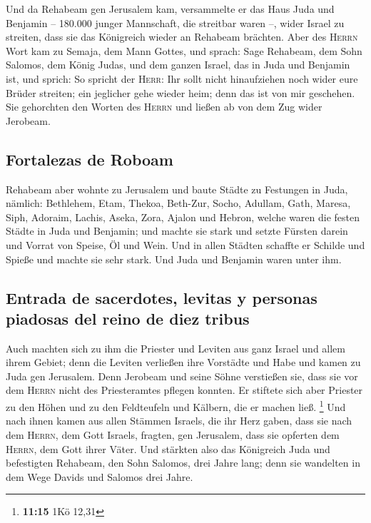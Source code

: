  Und da Rehabeam gen Jerusalem kam, versammelte er das
Haus Juda und Benjamin -- 180.000 junger Mannschaft, die streitbar waren
--, wider Israel zu streiten, dass sie das Königreich wieder an Rehabeam
brächten.  Aber des \textsc{Herrn} Wort kam zu Semaja, dem
Mann Gottes, und sprach:  Sage Rehabeam, dem Sohn Salomos,
dem König Judas, und dem ganzen Israel, das in Juda und Benjamin ist,
und sprich:  So spricht der \textsc{Herr}: Ihr sollt nicht
hinaufziehen noch wider eure Brüder streiten; ein jeglicher gehe wieder
heim; denn das ist von mir geschehen. Sie gehorchten den Worten des
\textsc{Herrn} und ließen ab von dem Zug wider Jerobeam.

\hypertarget{fortalezas-de-roboam}{%
\subsection{Fortalezas de Roboam}\label{fortalezas-de-roboam}}

 Rehabeam aber wohnte zu Jerusalem und baute Städte zu
Festungen in Juda,  nämlich: Bethlehem, Etam, Thekoa,
 Beth-Zur, Socho, Adullam,  Gath, Maresa,
Siph,  Adoraim, Lachis, Aseka,  Zora,
Ajalon und Hebron, welche waren die festen Städte in Juda und Benjamin;
 und machte sie stark und setzte Fürsten darein und
Vorrat von Speise, Öl und Wein.  Und in allen Städten
schaffte er Schilde und Spieße und machte sie sehr stark. Und Juda und
Benjamin waren unter ihm.

\hypertarget{entrada-de-sacerdotes-levitas-y-personas-piadosas-del-reino-de-diez-tribus}{%
\subsection{Entrada de sacerdotes, levitas y personas piadosas del reino
de diez
tribus}\label{entrada-de-sacerdotes-levitas-y-personas-piadosas-del-reino-de-diez-tribus}}

 Auch machten sich zu ihm die Priester und Leviten aus
ganz Israel und allem ihrem Gebiet;  denn die Leviten
verließen ihre Vorstädte und Habe und kamen zu Juda gen Jerusalem. Denn
Jerobeam und seine Söhne verstießen sie, dass sie vor dem \textsc{Herrn}
nicht des Priesteramtes pflegen konnten.  Er stiftete
sich aber Priester zu den Höhen und zu den Feldteufeln und Kälbern, die
er machen ließ. \footnote{\textbf{11:15} 1Kö 12,31}  Und
nach ihnen kamen aus allen Stämmen Israels, die ihr Herz gaben, dass sie
nach dem \textsc{Herrn}, dem Gott Israels, fragten, gen Jerusalem, dass
sie opferten dem \textsc{Herrn}, dem Gott ihrer Väter. 
Und stärkten also das Königreich Juda und befestigten Rehabeam, den Sohn
Salomos, drei Jahre lang; denn sie wandelten in dem Wege Davids und
Salomos drei Jahre.

